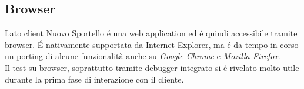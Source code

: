 \subsection{Browser}
Lato client Nuovo Sportello é una web application ed é quindi accessibile tramite browser. É nativamente supportata da Internet Explorer, ma é da tempo in corso un porting di alcune funzionalità anche su \textit{Google Chrome} e \textit{Mozilla Firefox}. \\
Il test su browser, soprattutto tramite debugger integrato si é rivelato molto utile durante la prima fase di interazione con il cliente. 